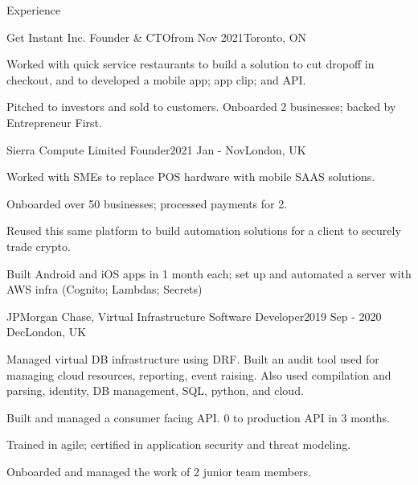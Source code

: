 \documentclass[10pt]{resume} %
\begin{document}
\begin{rSection}{Experience}


  \begin{rSubsection}{Get Instant Inc.}
    {Founder \& CTO}{from Nov 2021}{Toronto, ON}
  \item Worked with quick service restaurants to build a solution to cut dropoff
    in checkout, and to developed a mobile app; app clip; and API.
  \item Pitched to investors and sold to customers. Onboarded 2 businesses;
    backed by Entrepreneur First.
  \end{rSubsection}


  \begin{rSubsection}{Sierra Compute Limited}
    {Founder}{2021 Jan - Nov}{London, UK}
  \item Worked with SMEs to replace POS hardware with mobile SAAS solutions.
  \item Onboarded over 50 businesses; processed payments for 2.
  \item Reused this same platform to build automation solutions for a client to
    securely trade crypto.
  \item Built Android and iOS apps in 1 month each; set up and automated a
    server with AWS infra (Cognito; Lambdas; Secrets)
  \end{rSubsection}


  \begin{rSubsection}{JPMorgan Chase, Virtual Infrastructure}
    {Software Developer}{2019 Sep - 2020 Dec}{London, UK}
  \item Managed virtual DB infrastructure using DRF. Built an audit tool
    used for managing cloud resources, reporting, event raising. Also used
    compilation and parsing, identity, DB management, SQL, python, and cloud.
  \item Built and managed a consumer facing API. 0 to production API in 3 months.
  \item Trained in agile; certified in application security and threat modeling.
  \item Onboarded and managed the work of 2 junior team members.
  \end{rSubsection}


\end{rSection}
\end{document}
